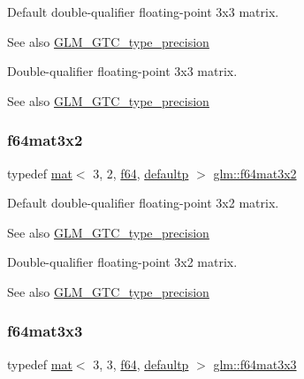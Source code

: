 Default double-\/qualifier floating-\/point 3x3 matrix. \begin{DoxySeeAlso}{See also}
\mbox{\hyperlink{group__gtc__type__precision}{G\+L\+M\+\_\+\+G\+T\+C\+\_\+type\+\_\+precision}}
\end{DoxySeeAlso}
Double-\/qualifier floating-\/point 3x3 matrix. \begin{DoxySeeAlso}{See also}
\mbox{\hyperlink{group__gtc__type__precision}{G\+L\+M\+\_\+\+G\+T\+C\+\_\+type\+\_\+precision}} 
\end{DoxySeeAlso}
\mbox{\label{group__gtc__type__precision_ga311a3bf48bfe2c95150e9f71db9063c5}} 
\subsubsection{\texorpdfstring{f64mat3x2}{f64mat3x2}}
{\footnotesize\ttfamily typedef \mbox{\hyperlink{structglm_1_1mat}{mat}}$<$ 3, 2, \mbox{\hyperlink{group__gtc__type__precision_ga2bba392e555124b36cde6abba349bab3}{f64}}, \mbox{\hyperlink{namespaceglm_a36ed105b07c7746804d7fdc7cc90ff25a9d21ccd8b5a009ec7eb7677befc3bf51}{defaultp}} $>$ \mbox{\hyperlink{group__gtc__type__precision_ga311a3bf48bfe2c95150e9f71db9063c5}{glm\+::f64mat3x2}}}

Default double-\/qualifier floating-\/point 3x2 matrix. \begin{DoxySeeAlso}{See also}
\mbox{\hyperlink{group__gtc__type__precision}{G\+L\+M\+\_\+\+G\+T\+C\+\_\+type\+\_\+precision}}
\end{DoxySeeAlso}
Double-\/qualifier floating-\/point 3x2 matrix. \begin{DoxySeeAlso}{See also}
\mbox{\hyperlink{group__gtc__type__precision}{G\+L\+M\+\_\+\+G\+T\+C\+\_\+type\+\_\+precision}} 
\end{DoxySeeAlso}
\mbox{\label{group__gtc__type__precision_ga3b494201796c4200886e59f9695ecff0}} 
\subsubsection{\texorpdfstring{f64mat3x3}{f64mat3x3}}
{\footnotesize\ttfamily typedef \mbox{\hyperlink{structglm_1_1mat}{mat}}$<$ 3, 3, \mbox{\hyperlink{group__gtc__type__precision_ga2bba392e555124b36cde6abba349bab3}{f64}}, \mbox{\hyperlink{namespaceglm_a36ed105b07c7746804d7fdc7cc90ff25a9d21ccd8b5a009ec7eb7677befc3bf51}{defaultp}} $>$ \mbox{\hyperlink{group__gtc__type__precision_ga3b494201796c4200886e59f9695ecff0}{glm\+::f64mat3x3}}}


